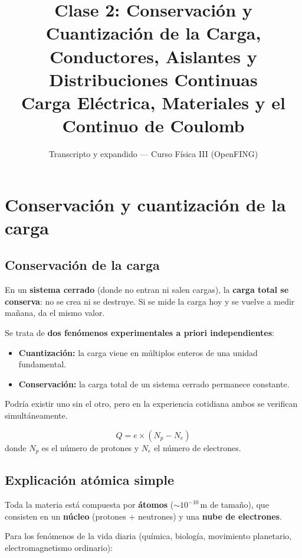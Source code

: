 \documentclass[12pt,a4paper]{article}
\title{\textbf{Clase 2: Conservación y Cuantización de la Carga, \\
        Conductores, Aislantes y Distribuciones Continuas}\\[0.3em]
        \large Carga Eléctrica, Materiales y el Continuo de Coulomb}
\author{Transcripto y expandido --- Curso Física III (OpenFING)}
\date{}
\begin{document}
\maketitle
\thispagestyle{empty}
\newpage

\tableofcontents
\newpage

\section{Conservación y cuantización de la carga}

\subsection{Conservación de la carga}

En un \textbf{sistema cerrado} (donde no entran ni salen cargas), la
\textbf{carga total se conserva}: no se crea ni se destruye. Si se mide
la carga hoy y se vuelve a medir mañana, da el mismo valor.

Se trata de \textbf{dos fenómenos experimentales a priori
independientes}:
\begin{itemize}[nosep]
  \item \textbf{Cuantización:} la carga viene en múltiplos enteros de
        una unidad fundamental.
  \item \textbf{Conservación:} la carga total de un sistema cerrado
        permanece constante.
\end{itemize}

Podría existir uno sin el otro, pero en la experiencia cotidiana ambos
se verifican simultáneamente.

\begin{keybox}
  \[
  Q = e \times (N_p - N_e)
  \]
  donde $N_p$ es el número de protones y $N_e$ el número de electrones.
\end{keybox}

\subsection{Explicación atómica simple}

Toda la materia está compuesta por \textbf{átomos} ($\sim 10^{-10}$\,m
de tamaño), que consisten en un \textbf{núcleo} (protones $+$ neutrones)
y una \textbf{nube de electrones}.

Para los fenómenos de la vida diaria (química, biología, movimiento
planetario, electromagnetismo ordinario):
\end{document}
